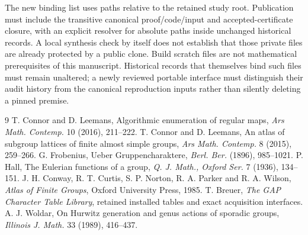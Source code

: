 \documentclass[11pt,a4paper]{article}
\begin{document}
The new binding list uses paths relative to the retained study root.
Publication must include the transitive canonical proof/code/input and
accepted-certificate closure, with an explicit resolver for absolute paths
inside unchanged historical records. A local synthesis check by itself
does not establish that those private files are already protected by a
public clone. Build scratch files are not mathematical prerequisites of
this manuscript. Historical records that themselves bind such files must
remain unaltered; a newly reviewed portable interface must distinguish
their audit history from the canonical reproduction inputs rather than
silently deleting a pinned premise.


\begin{thebibliography}{9}
 T. Connor and D. Leemans, Algorithmic enumeration of regular
maps, \emph{Ars Math. Contemp.} 10 (2016), 211--222.
 T. Connor and D. Leemans, An atlas of subgroup lattices
of finite almost simple groups, \emph{Ars Math. Contemp.} 8 (2015), 259--266.
 G. Frobenius, Ueber Gruppencharaktere,
\emph{Berl. Ber.} (1896), 985--1021.
 P. Hall, The Eulerian functions of a group,
\emph{Q. J. Math., Oxford Ser.} 7 (1936), 134--151.
 J. H. Conway, R. T. Curtis, S. P. Norton, R. A. Parker
and R. A. Wilson, \emph{Atlas of Finite Groups}, Oxford University Press, 1985.
 T. Breuer, \emph{The GAP Character Table Library}, retained
installed tables and exact acquisition interfaces.
 A. J. Woldar, On Hurwitz generation and genus actions of
sporadic groups, \emph{Illinois J. Math.} 33 (1989), 416--437.
\end{thebibliography}
\end{document}
